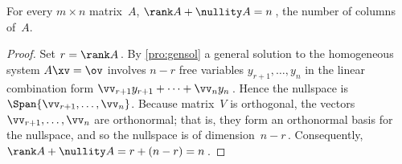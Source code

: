 \begin{theorem} \label{thm:rank} 
For every \(m\times n\) matrix~\(A\),  \(\rank A+\nullity A=n\)\,, the number of columns of~\(A\).
\end{theorem}
\begin{proof} 
Set \(r=\rank A\)\,.
By \autoref{pro:gensol} a general solution to the homogeneous system \(A\xv=\ov\) involves \(n-r\) free variables \(y_{r+1},\ldots,y_n\) in the linear combination form \(\vv_{r+1}y_{r+1}+\cdots +\vv_ny_n\)\,.  
Hence the nullspace is \(\Span\{\vv_{r+1},\ldots,\vv_n\}\).
Because matrix~\(V\) is orthogonal, the vectors \(\vv_{r+1},\ldots,\vv_n\) are orthonormal; that is, they form an orthonormal basis for the nullspace, and so the nullspace is of dimension~\(n-r\)\,.
Consequently, \(\rank A+\nullity A=r+(n-r)=n\)\,.
\end{proof}


